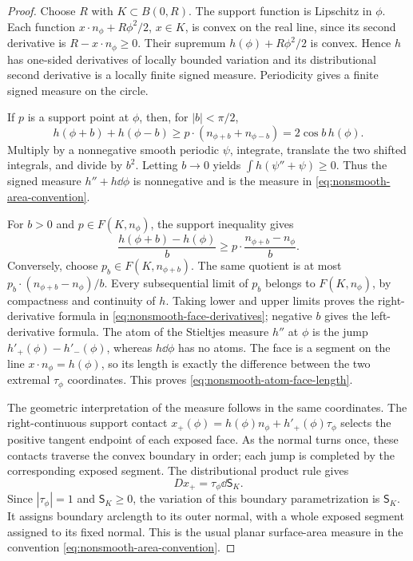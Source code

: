 \begin{proof}
Choose $R$ with $K\subset B(0,R)$.  The support function is
Lipschitz in $\phi$.  Each function
$x\cdot n_\phi+R\phi^2/2$, $x\in K$, is convex on the real
line, since its second derivative is $R-x\cdot n_\phi\ge0$.
Their supremum $h(\phi)+R\phi^2/2$ is convex.  Hence $h$ has
one-sided derivatives of locally bounded variation and its
distributional second derivative is a locally finite signed
measure.  Periodicity gives a finite signed measure on the circle.

If $p$ is a support point at $\phi$, then, for $|b|<\pi/2$,
\[
 h(\phi+b)+h(\phi-b)
 \ge p\cdot(n_{\phi+b}+n_{\phi-b})
 =2\cos b\,h(\phi).
\]
Multiply by a nonnegative smooth periodic $\psi$, integrate,
translate the two shifted integrals, and divide by $b^2$.
Letting $b\to0$ yields
$\int h(\psi''+\psi)\ge0$.  Thus the signed measure
$h''+h\dd\phi$ is nonnegative and is the measure in
\eqref{eq:nonsmooth-area-convention}.

For $b>0$ and $p\in F(K,n_\phi)$, the support inequality gives
\[
 \frac{h(\phi+b)-h(\phi)}{b}
       \ge p\cdot\frac{n_{\phi+b}-n_\phi}{b}.
\]
Conversely, choose $p_b\in F(K,n_{\phi+b})$.  The same
quotient is at most
$p_b\cdot(n_{\phi+b}-n_\phi)/b$.
Every subsequential limit of $p_b$ belongs to $F(K,n_\phi)$,
by compactness and continuity of $h$.  Taking lower and upper
limits proves the right-derivative formula in
\eqref{eq:nonsmooth-face-derivatives}; negative $b$ gives the
left-derivative formula.  The atom of the Stieltjes measure
$h''$ at $\phi$ is the jump $h'_+(\phi)-h'_-(\phi)$, whereas
$h\dd\phi$ has no atoms.  The face is a segment on the line
$x\cdot n_\phi=h(\phi)$, so its length is exactly the difference
between the two extremal $\tau_\phi$ coordinates.  This proves
\eqref{eq:nonsmooth-atom-face-length}.

The geometric interpretation of the measure follows in the same
coordinates.  The right-continuous support contact
$x_+(\phi)=h(\phi)n_\phi+h'_+(\phi)\tau_\phi$ selects the
positive tangent endpoint of each exposed face.  As the normal
turns once, these contacts traverse the convex boundary in order;
each jump is completed by the corresponding exposed segment.
The distributional product rule gives
\[
                      D x_+=\tau_\phi\dd\mathsf S_K.
\]
Since $|\tau_\phi|=1$ and $\mathsf S_K\ge0$, the variation
of this boundary parametrization is $\mathsf S_K$.  It assigns
boundary arclength to its outer normal, with a whole exposed
segment assigned to its fixed normal.  This is the usual planar
surface-area measure in the convention
\eqref{eq:nonsmooth-area-convention}.


\end{proof}
